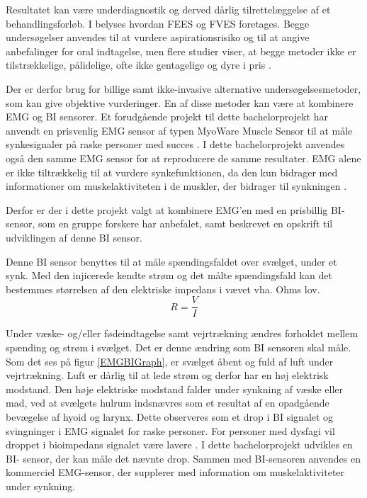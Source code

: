 Resultatet kan være underdiagnostik og derved dårlig tilrettelæggelse af et behandlingsforløb. I  belyses hvordan FEES og FVES foretages. Begge undersøgelser anvendes til at vurdere aspirationsrisiko og til at angive anbefalinger for oral indtagelse, men flere studier viser, at begge metoder ikke er tilstrækkelige, pålidelige, ofte ikke gentagelige og dyre i pris \cite{Kelly2006} \cite{McCullough2001} \cite{Schultheiss2014} \cite{Nahrstaedt2012a}.  

Der er derfor brug for billige samt ikke-invasive alternative undersøgelsesmetoder, som kan give objektive vurderinger. En af disse metoder kan være at kombinere EMG og BI sensorer. Et forudgående projekt til dette bachelorprojekt har anvendt en prisvenlig EMG sensor af typen MyoWare Muscle Sensor til at måle synkesignaler på raske personer med succes \cite [s. 58] {ChristensenElisabeth;LundbakStrand2017}. I dette bachelorprojekt anvendes også den samme EMG sensor for at reproducere de samme resultater. EMG alene er ikke tiltrækkelig til at vurdere synkefunktionen, da den kun bidrager med informationer om muskelaktiviteten i de muskler, der bidrager til synkningen \cite{Schultheiss2014}. 

Derfor er der i dette projekt valgt at kombinere EMG'en med en prisbillig BI-sensor, som en gruppe forskere har anbefalet, samt beskrevet en opskrift til udviklingen af denne BI sensor\cite{Aroom2009}.

Denne BI sensor benyttes til at måle spændingsfaldet over svælget, under et synk. Med den injicerede kendte strøm og det målte spændingsfald kan det bestemmes størrelsen af den elektriske impedans i vævet vha. Ohms lov. \\
$$ R= \dfrac{V}{I} $$

Under væske- og/eller fødeindtagelse samt vejrtrækning ændres forholdet mellem spænding og strøm i svælget. Det er denne ændring som BI sensoren skal måle. Som det ses på figur \ref{EMGBIGraph}, er svælget åbent og fuld af luft under vejrtrækning. Luft er dårlig til at lede strøm og derfor har en høj elektrisk modstand. Den høje elektriske modstand falder under synkning af væske eller mad, ved at svælgets hulrum indsnævres som et resultat af en opadgående bevægelse af hyoid og larynx. Dette observeres som et drop i BI signalet og svingninger i EMG signalet for raske personer. For personer med dysfagi vil droppet i bioimpedans signalet være lavere  \cite{Schultheiss2014}. I dette bachelorprojekt udvikles en BI- sensor, der kan måle det nævnte drop. Sammen med BI-sensoren anvendes en kommerciel EMG-sensor, der supplerer med information om muskelaktiviteter under synkning.




